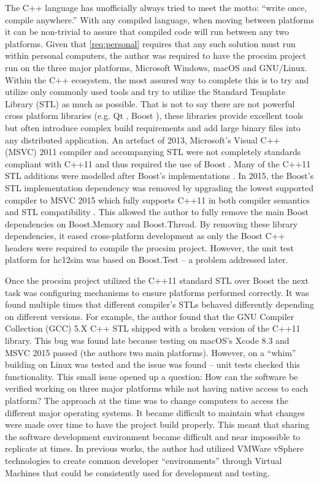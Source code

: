 The C++ language has unofficially always tried to meet the motto: ``write once, compile anywhere.'' With any compiled language, when moving between platforms it can be non-trivial to assure that compiled code will run between any two platforms. Given that \cref{req:personal} requires that any such solution must run within personal computers, the author was required to have the procsim project run on the three major platforms, Microsoft Windows, macOS and GNU/Linux. Within the C++ ecosystem, the most assured way to complete this is to try and utilize only commonly used tools and try to utilize the Standard Template Library (STL) as much as possible. That is not to say there are not powerful cross platform libraries (e.g. Qt \cite{Qt}, Boost \cite{Boost}), these libraries provide excellent tools but often introduce complex build requirements and add large binary files into any distributed application. An artefact of 2013, Microsoft's Visual C++ (MSVC) 2011 compiler and accompanying STL were not completely standards compliant with C++11 and thus \cite{Brightwell2013} required the use of Boost \cite{Microsoft:MSVC:ModernCPP:2011}. Many of the C++11 STL additions were modelled after Boost's implementations \cite{Meyers2005}. In 2015, the Boost's STL implementation dependency was removed by upgrading the lowest supported compiler to MSVC 2015 which fully supports C++11 in both compiler semantics and STL compatibility \cite{Microsoft:MSVC:ModernCPP}. This allowed the author to fully remove the main Boost dependencies on Boost.Memory and Boost.Thread. By removing these library dependencies, it eased cross-platform development as only the Boost C++ headers were required to compile the procsim project. However, the unit test platform for hc12sim was based on Boost.Test \cite{Boost1.53.0:Test} -- a problem addressed later.

Once the procsim project utilized the C++11 standard STL over Boost the next task was configuring mechanisms to ensure platforms performed correctly. It was found multiple times that different compiler's STLs behaved differently depending on different versions. For example, the author found that the GNU Compiler Collection (GCC) \cite{GCC} 5.X C++ STL shipped with a broken version of the C++11  library. This bug was found late because testing on macOS's Xcode 8.3 and MSVC 2015 passed (the authors two main platforms). However, on a ``whim'' building on Linux was tested and the issue was found -- unit tests checked this functionality. This small issue opened up a question: How can the software be verified working on three major platforms while not having native access to each platform? The approach at the time was to change computers to access the different major operating systems. It became difficult to maintain what changes were made over time to have the project build properly. This meant that sharing the software development environment became difficult and near impossible to replicate at times. In previous works, the author had utilized VMWare vSphere \cite{VMWare:vSphere} technologies to create common developer ``environments'' through Virtual Machines that could be consistently used for development and testing. 

